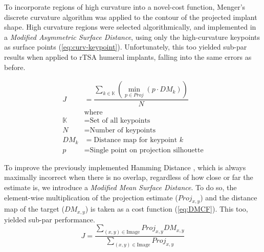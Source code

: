 To incorporate regions of high curvature into a novel-cost function, Menger's discrete curvature algorithm \cite{legerMengerCurvatureRectifiability1999} was applied to the contour of the projected implant shape.
High curvature regions were selected algorithmically, and implemented in a \emph{Modified Asymmetric Surface Distance}, using only the high-curvature keypoints as surface points (\cref{eq:curv-keypoint}).
Unfortunately, this too yielded sub-par results when applied to rTSA humeral implants, falling into the same errors as before.


\begin{equation}
	\label{eq:curv-keypoint}
	\begin{split}
		\displaystyle J & = \dfrac{\sum_{k \in \mathbb{K}}(\min_{p\in Proj}(p \cdot DM_{k}))}{N} \\
		                & \text{where}                                                           \\
		\mathbb{K}      & = \text{Set of all keypoints}                                          \\
		N               & = \text{Number of keypoints}                                           \\
		DM_{k}          & = \text{Distance map for keypoint $k$}                                 \\
		p               & = \text{Single point on projection silhouette}
	\end{split}
\end{equation}

To improve the previously implemented Hamming Distance \cite{jensenJointTrackMachine2023,floodAutomatedRegistration3D2018}, which is always maximally incorrect when there is no overlap, regardless of how close or far the estimate is, we introduce a \emph{Modified Mean Surface Distance}.
To do so, the element-wise multiplication of the projection estimate ($Proj_{x,y}$) and the distance map of the target ($DM_{x,y}$) is taken as a cost function (\cref{eq:DMCF}).
This too, yielded sub-par performance.
\begin{equation}
	\label{eq:DMCF}
	J = \dfrac{ \sum_{(x,y) \in \text{Image}} Proj_{x,y}DM_{x,y} }{\sum_{(x,y)\in \text{Image}}Proj_{x,y}}
\end{equation}

